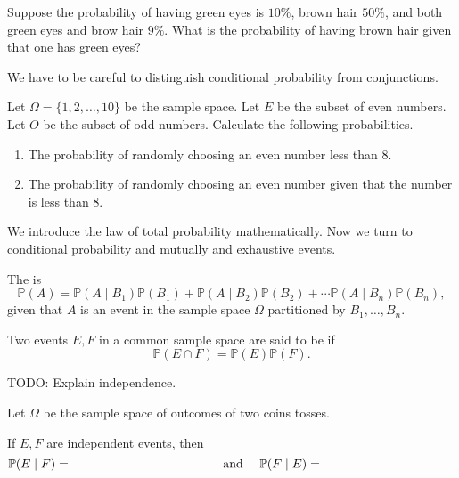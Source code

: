 \documentclass[../main.tex]{subfiles}
\begin{document}
\begin{example}
  Suppose the probability of having green eyes is \(10\%\), brown hair \(50\%\), and both green eyes and brow hair \(9\%\). What is the probability of having brown hair given that one has green eyes?
\end{example}

We have to be careful to distinguish conditional probability from conjunctions. 
\begin{example}
  Let \(\Omega = \{1,2,\ldots,10\}\) be the sample space.  Let \(E\) be the subset of even numbers. Let \(O\) be the subset of odd numbers.  Calculate the following probabilities.

  \begin{enumerate}[wide]
    \item The probability of randomly choosing an even number less than \(8\).
    \item The probability of randomly choosing an even number given that the number is less than \(8\).
  \end{enumerate}
\end{example}

We introduce the law of total probability mathematically. Now we turn to conditional probability and mutually and exhaustive events. 

\begin{definition}
  The  is
  \[
    \mathbb{P}(A) = \mathbb{P}(A \mid B_{1}) \mathbb{P}(B_{1}) + \mathbb{P}(A \mid B_{2}) \mathbb{P}(B_{2}) + \cdots \mathbb{P}(A \mid B_{n}) \mathbb{P}(B_{n}),
  \]
  given that \(A\) is an event in the sample space \(\Omega\) partitioned by \(B_{1},\ldots,B_{n}\).
\end{definition}

\begin{definition}
  Two events \(E,F\) in a common sample space are said to be  if 
  \[
    \mathbb{P}(E \cap F) = \mathbb{P}(E) \mathbb{P}(F).
  \]
\end{definition}

TODO: Explain independence. 

\begin{example}
  Let \(\Omega\) be the sample space of outcomes of two coins tosses.  
\end{example}

\faStar{} If \(E,F\) are independent events, then
\begin{equation} \label{eq:probability-conditional-of-independent}
  \mathbb{P}(E \mid F) = \hspace{1.5in}
  \quad\text{ and }\quad
  \mathbb{P}(F \mid E) = \hspace{1.5in}
\end{equation}
\end{document}
